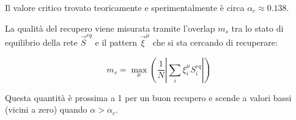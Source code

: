 Il valore critico trovato teoricamente e sperimentalmente è circa $\alpha_c \approx 0.138$.

La qualità del recupero viene misurata tramite l'overlap $m_s$ tra lo stato di equilibrio della rete $\vec{S}^{eq}$ e il pattern $\vec{\xi}^\mu$ che si sta cercando di recuperare:

\begin{equation} \label{eq:ch21_29}
m_s = \max_\mu \left( \frac{1}{N} \left| \sum_i \xi_i^\mu S_i^{eq} \right| \right)
\end{equation}

Questa quantità è prossima a 1 per un buon recupero e scende a valori bassi (vicini a zero) quando $\alpha > \alpha_c$.
